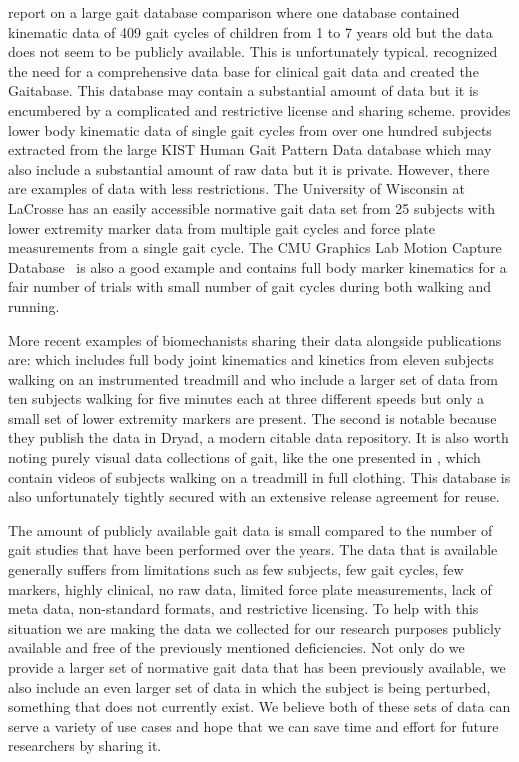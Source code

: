 \documentclass[fleqn,12pt]{wlpeerj}
\begin{document}
\cite{Chester2007} report on a large gait database comparison where one
database contained kinematic data of 409 gait cycles of children from 1 to 7
years old but the data does not seem to be publicly available. This is
unfortunately typical. \cite{Tirosh2010} recognized the need for a
comprehensive data base for clinical gait data and created the Gaitabase. This
database may contain a substantial amount of data but it is encumbered by a
complicated and restrictive license and sharing scheme. \cite{Yun2014} provides
lower body kinematic data of single gait cycles from over one hundred subjects
extracted from the large KIST Human Gait Pattern Data database which may also
include a substantial amount of raw data but it is private. However, there are
examples of data with less restrictions. The University of Wisconsin at
LaCrosse has an easily accessible normative gait data set \citep{Willson2014}
from 25 subjects with lower extremity marker data from multiple gait cycles and
force plate measurements from a single gait cycle. The CMU Graphics Lab Motion
Capture Database~\citep{CMU2015} is also a good example and contains full body
marker kinematics for a fair number of trials with small number of gait cycles
during both walking and running.

More recent examples of biomechanists sharing their data alongside publications
are: \cite{Bogert2013} which includes full body joint kinematics and kinetics
from eleven subjects walking on an instrumented treadmill and \cite{Wang2014}
who include a larger set of data from ten subjects walking for five minutes
each at three different speeds but only a small set of lower extremity markers
are present. The second is notable because they publish the data in Dryad, a
modern citable data repository. It is also worth noting purely visual data
collections of gait, like the one presented in \cite{Makihara2012}, which
contain videos of subjects walking on a treadmill in full clothing. This
database is also unfortunately tightly secured with an extensive release
agreement for reuse.

The amount of publicly available gait data is small compared to the number of
gait studies that have been performed over the years. The data that is
available generally suffers from limitations such as few subjects, few gait
cycles, few markers, highly clinical, no raw data, limited force plate
measurements, lack of meta data, non-standard formats, and restrictive
licensing. To help with this situation we are making the data we collected for
our research purposes publicly available and free of the previously mentioned
deficiencies. Not only do we provide a larger set of normative gait data that
has been previously available, we also include an even larger set of data in
which the subject is being perturbed, something that does not currently exist.
We believe both of these sets of data can serve a variety of use cases and hope
that we can save time and effort for future researchers by sharing it.
\end{document}
